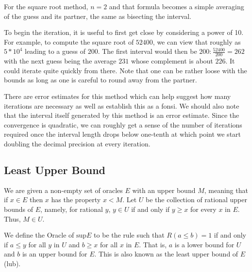 \documentclass[12pt]{article}
\theoremstyle{remark}
\begin{document}
For the square root method, $n=2$ and that formula becomes a simple averaging of the guess and its partner, the same as bisecting the interval.  

To begin the iteration, it is useful to first get close by considering a power of 10. For example, to compute the square root of $52400$, we can view that roughly as $5*10^4$ leading to a guess of $200$. The first interval would then be $200: \frac{52400}{200} = 262$ with the next guess being the average $231$ whose complement is about $226$. It could iterate quite quickly from there. Note that one can be rather loose with the bounds as long as one is careful to round away from the partner.  

There are error estimates for this method which can help suggest how many iterations are necessary as well as establish this as a fonsi. We should also note that the interval itself generated by this method is an error estimate. Since the convergence is quadratic, we can roughly get a sense of the number of iterations required once the interval length drops below one-tenth at which point we start doubling the decimal precision at every iteration.  


\subsection{Least Upper Bound}

We are given a non-empty set of oracles $E$ with an upper bound $M$, meaning that if $x \in E$ then $x$ has the property $x < M$. Let $U$ be the collection of rational upper bounds of $E$, namely, for rational $y$, $y \in U$ if and only if $y \geq x$ for every $x$ in $E$.  Thus, $M \in U$.

We define the Oracle of $\mathrm{sup} E$ to be the rule such that $R(a\leq b) = 1$ if and only if $a \leq y$ for all $y$ in $U$ and $b \geq x$ for all $x$ in $E$. That is, $a$ is a lower bound for $U$ and $b$ is an upper bound for $E$. This is also known as the least upper bound of $E$ (lub).
\end{document}
